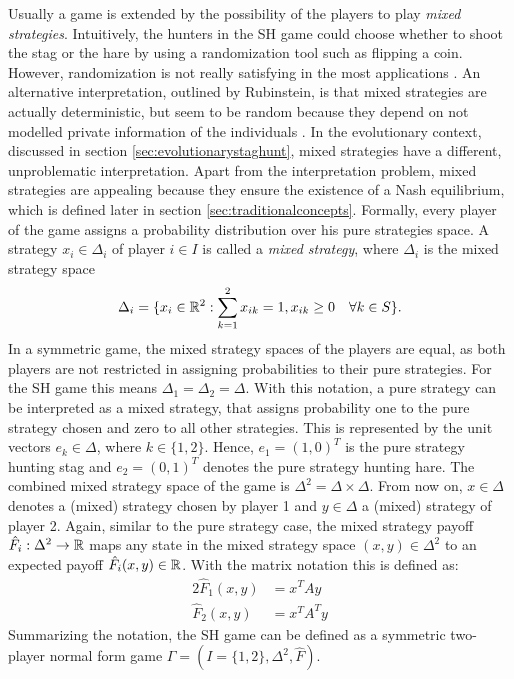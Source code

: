 Usually a game is extended by the possibility of the players to play
\textit{mixed strategies}. 
Intuitively, the hunters in the SH game could  
choose whether to shoot the stag or the hare by using a randomization
tool such as flipping a coin. However, randomization is not really
satisfying in the most applications \parencite{radner_private_1982}. An
alternative interpretation, outlined by Rubinstein, is that mixed 
strategies are actually deterministic, but seem to be random because they 
depend on not modelled private information of the individuals 
\parencite[914]{rubinstein_comments_1991}. In the evolutionary context,
discussed in section \ref{sec:evolutionarystaghunt}, mixed strategies have
a different, unproblematic interpretation. Apart from the interpretation 
problem, mixed strategies are appealing because they ensure the existence
of a Nash equilibrium, which is defined later in section 
\ref{sec:traditionalconcepts}.
Formally, every player of the game assigns a probability distribution over
his pure strategies space. A strategy $x_i \in \Delta_i$ of 
player $i \in I$ is called a \textit{mixed strategy}, where $\Delta_i$ is 
the mixed strategy space 
\begin{align*}
        \Delta_i = \{ x_i \in \mathbb{R}^2 : \sum_{k=1}^2 x_{ik} = 1, x_{ik} \geq 0 \quad
\forall k \in S\}.
\end{align*}
In a symmetric game, the mixed strategy spaces of the players are
equal, as both players are not restricted in assigning probabilities to their
pure strategies. For the SH game this means $\Delta_1 = \Delta_2 = \Delta$.
With this notation, a pure strategy can be interpreted as a mixed strategy,
that assigns probability one to the pure strategy chosen and zero to all
other strategies. This is represented by the unit vectors 
$e_k \in \Delta$, where $k \in \{1,2\}$. 
Hence, $e_1 = (1,0)^T$ is the pure strategy hunting stag 
and $e_2 =(0,1)^T$ denotes the pure strategy hunting hare.
The combined mixed strategy space of the game is $\Delta^2 = \Delta \times
\Delta$.
From now on, $x \in \Delta$ denotes a (mixed) strategy
chosen by player 1 and $y \in \Delta$ a (mixed) strategy of player 2.
Again, similar to the pure strategy case, the mixed strategy payoff 
$\hat{F}_i:\Delta^2 \rightarrow \mathbb{R}$ maps 
any state in the mixed strategy
space  $(x,y) \in \Delta^2$ to an expected payoff 
$\hat{F}_i(x,y) \in \mathbb{R}$.
With the matrix notation this is defined as: 
\begin{alignat*}{2}
        \hat{F}_1(x,y) &= x^T A y \\
        \hat{F}_2(x,y) &= x^T A^T y 
\end{alignat*}
Summarizing the notation, the SH game can be defined as a symmetric two-player
normal form game $\Gamma = (I=\{1,2\}, \Delta^2, \hat{F})$.

